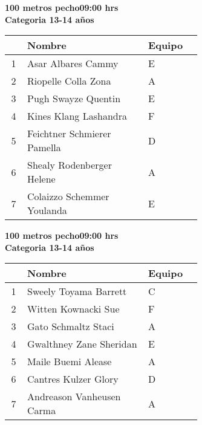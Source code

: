 \begin{minipage}{0.95\linewidth}\vspace{0.5cm} 
\begin{flushleft}
\textbf{
\hspace{-0.15cm}100 metros pecho\hspace{1.5cm}09:00 hrs \\Categoria 13-14 años}\vspace{-0.2cm} 
\end{flushleft}
\begin{tabular}{cp{0.63\linewidth}l}
\hline
& \textbf{Nombre} & \textbf{Equipo} \\ \hline
1 & Asar Albares Cammy & E \\ 
2 & Riopelle Colla Zona & A \\ 
3 & Pugh Swayze Quentin & E \\ 
4 & Kines Klang Lashandra & F \\ 
5 & Feichtner Schmierer Pamella & D \\ 
6 & Shealy Rodenberger Helene & A \\ 
7 & Colaizzo Schemmer Youlanda & E \\ 
\end{tabular}
\end{minipage}
\begin{minipage}{0.95\linewidth}\vspace{0.5cm} 
\begin{flushleft}
\textbf{
\hspace{-0.15cm}100 metros pecho\hspace{1.5cm}09:00 hrs \\Categoria 13-14 años}\vspace{-0.2cm} 
\end{flushleft}
\begin{tabular}{cp{0.63\linewidth}l}
\hline
& \textbf{Nombre} & \textbf{Equipo} \\ \hline
1 & Sweely Toyama Barrett & C \\ 
2 & Witten Kownacki Sue & F \\ 
3 & Gato Schmaltz Staci & A \\ 
4 & Gwalthney Zane Sheridan & E \\ 
5 & Maile Buemi Alease & A \\ 
6 & Cantres Kulzer Glory & D \\ 
7 & Andreason Vanheusen Carma & A \\ 
\end{tabular}
\end{minipage}
